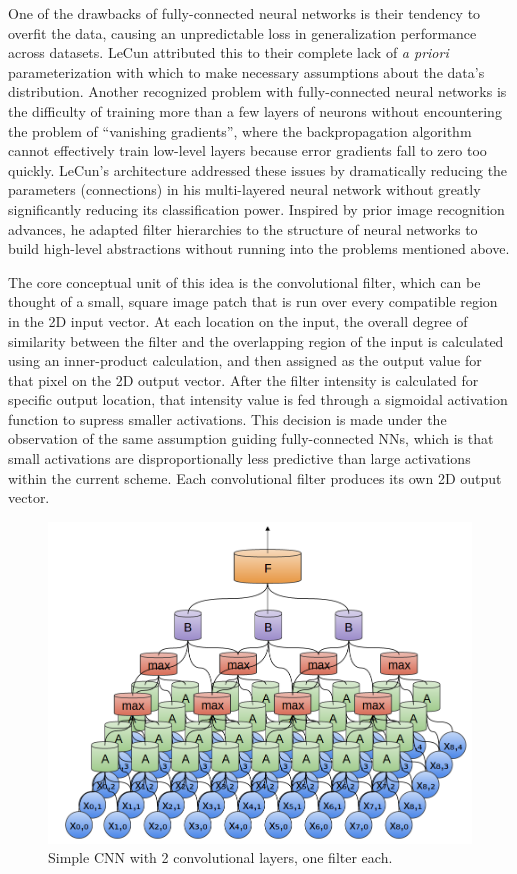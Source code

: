 \documentclass[midd]{thesis}
\begin{document}
One of the drawbacks of fully-connected neural networks is their tendency to overfit the data, causing an unpredictable loss in generalization performance across datasets. LeCun attributed this to their complete lack of \emph{a priori} parameterization with which to make necessary assumptions about the data's distribution. Another recognized problem with fully-connected neural networks is the difficulty of training more than a few layers of neurons without encountering the problem of ``vanishing gradients'', where the backpropagation algorithm cannot effectively train low-level layers because error gradients fall to zero too quickly. 
LeCun's architecture addressed these issues by dramatically reducing the parameters (connections) in his multi-layered neural network without greatly significantly reducing its classification power. Inspired by prior image recognition advances, he adapted filter hierarchies to the structure of neural networks to build high-level abstractions without running into the problems mentioned above. 

The core conceptual unit of this idea is the convolutional filter, which can be thought of a small, square image patch that is run over every compatible region in the 2D input vector. At each location on the input, the overall degree of similarity between the filter and the overlapping region of the input is calculated using an inner-product calculation, and then assigned as the output value for that pixel on the 2D output vector. After the filter intensity is calculated for specific output location, that intensity value is fed through a sigmoidal activation function to supress smaller activations. This decision is made under the observation of the same assumption guiding fully-connected NNs, which is that small activations are disproportionally less predictive than large activations within the current scheme. Each convolutional filter produces its own 2D output vector. 

\begin{figure}[t]
\centering
\includegraphics[width=\textwidth]{visualizations/simple-cnn.png}
\caption{Simple CNN with 2 convolutional layers, one filter each.}
\label{fig:cnn-in-neurons}
\end{figure}
\end{document}
